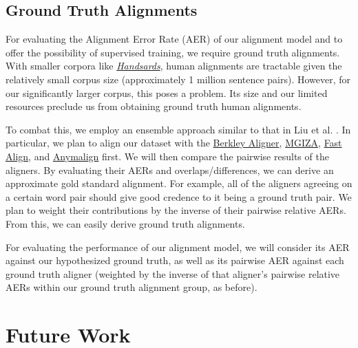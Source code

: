 \documentclass[twoside,twocolumn]{article}
\begin{document}
\subsection{Ground Truth Alignments}
\label{subsec:ground-truth-alignments}

For evaluating the Alignment Error Rate (AER) of our alignment model and to
offer the possibility of supervised training, we require ground truth
alignments. With smaller corpora like
\href{https://www.isi.edu/natural-language/download/hansard/}{\textit{Handsards}},
human alignments are tractable given the relatively small corpus size
(approximately 1 million sentence pairs). However, for our significantly larger
corpus, this poses a problem. Its size and our limited resources preclude us
from obtaining ground truth human alignments.

To combat this, we employ an ensemble approach similar to that in Liu et al.
\cite{liu2015streaming}. In particular, we plan to align our dataset with
the
\href{http://nlp.cs.berkeley.edu/projects/historical.shtml#WordAligner}{Berkley Aligner},
\href{https://clear.colorado.edu/CompSemWiki/index.php/MGIZA\%2B\%2B}{MGIZA},
\href{https://github.com/clab/fast\_align}{Fast Align}, and
\href{https://anymalign.limsi.fr/}{Anymalign} first. We will then compare the
pairwise results of the aligners. By evaluating their AERs and
overlaps/differences, we can derive an approximate gold standard alignment. For
example, all of the aligners agreeing on a certain word pair should give good
credence to it being a ground truth pair. We plan to weight their contributions
by the inverse of their pairwise relative AERs. From this, we can easily derive
ground truth alignments.

For evaluating the performance of our alignment model, we will consider its
AER against our hypothesized ground truth, as well as its pairwise AER against
each ground truth aligner (weighted by the inverse of that aligner's pairwise
relative AERs within our ground truth alignment group, as before).

\section{Future Work}





\end{document}
